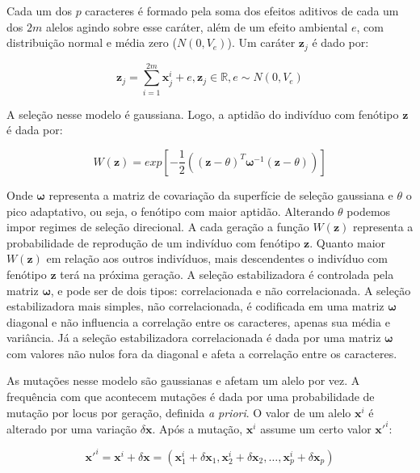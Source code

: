 Cada um dos $p$ caracteres é formado pela soma dos efeitos aditivos de
cada um dos $2m$ alelos agindo sobre esse caráter, além de um efeito
ambiental $e$, com distribuição normal e média zero ($N(0,V_e)$).
Um caráter $\mathbf{z}_j$ é dado
por:

\begin{equation}
    \mathbf{z}_j = \sum_{i=1}^{2m} \mathbf{x}^i_j + e, \mathbf{z}_j \in \mathbb{R}, e \sim N(0, V_e)
\end{equation}

A seleção nesse modelo é gaussiana.
Logo, a aptidão do indivíduo com fenótipo $\mathbf{z}$ é dada por:

\begin{equation}
W(\mathbf{z}) = exp \left[-\frac{1}{2} ((\mathbf{z}-\theta)^T \pmb{\omega}^{-1} (\mathbf{z}-\theta))\right] 
\label{selecao}
\end{equation}

Onde $\pmb{\omega}$ representa a matriz de covariação da superfície de seleção
gaussiana e $\theta$ o pico adaptativo, ou seja, o fenótipo com maior
aptidão.
Alterando $\theta$ podemos impor regimes de seleção direcional.
A cada geração a função $W(\mathbf{z})$ representa a probabilidade de reprodução
de um indivíduo com fenótipo $\mathbf{z}$.
Quanto maior $W(\mathbf{z})$ em relação aos outros indivíduos, mais descendentes
o indivíduo com fenótipo $\mathbf{z}$ terá na próxima geração.
A seleção estabilizadora é controlada pela matriz $\pmb{\omega}$, e
pode ser de dois tipos: correlacionada e não correlacionada.
A seleção estabilizadora mais simples, não correlacionada, é codificada
em uma matriz $\pmb{\omega}$ diagonal e não influencia a correlação entre os
caracteres, apenas sua média e variância.
Já a seleção estabilizadora correlacionada é dada por uma matriz
$\pmb{\omega}$ com valores não nulos fora da diagonal e afeta a correlação
entre os caracteres.

As mutações nesse modelo são gaussianas e afetam um alelo por vez.
A frequência com que acontecem mutações é dada por uma probabilidade de
mutação por locus por geração, definida {\it a priori}.
O valor de um alelo $\mathbf{x}^i$ é alterado por uma variação $ \delta \mathbf{x}$.
Após a mutação, $\mathbf{x}^i$ assume um certo valor $\mathbf{x}'^i$:

\begin{equation}
\mathbf{x}'^i = \mathbf{x}^i + \delta \mathbf{x} = ( \mathbf{x}^i_1 + \delta \mathbf{x}_1, \mathbf{x}^i_2 + \delta \mathbf{x}_2,\ldots, \mathbf{x}^i_p + \delta \mathbf{x}_p)
\end{equation}

